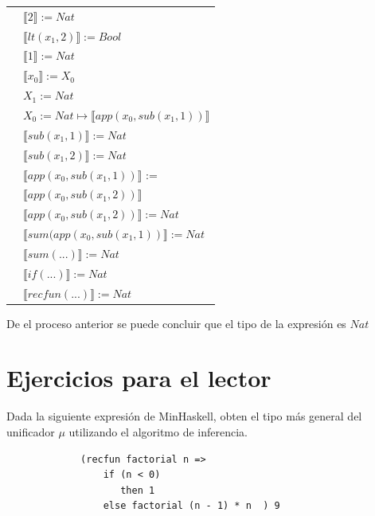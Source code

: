\begin{exercise}
\begin{description}
\begin{center}
\begin{longtable}{ | l | l | }
                        & $ \llbracket 2 \rrbracket := Nat$\\ 
                        & $ \llbracket lt(x_1 , 2) \rrbracket := Bool$\\  
			     & $ \llbracket 1 \rrbracket := Nat$\\
			     & $ \llbracket x_0 \rrbracket := X_0$\\
			     & $X_1 := Nat$\\
			     & $X_0 := Nat \mapsto  \llbracket app(x_0, sub(x_1,1)) \rrbracket$\\
			     & $ \llbracket sub(x_1,1) \rrbracket := Nat$\\
			     & $ \llbracket sub(x_1,2) \rrbracket := Nat$ \\
			     & $ \llbracket app(x_0, sub(x_1,1)) \rrbracket$ := \\
			     & $ \llbracket app(x_0, sub(x_1,2)) \rrbracket$\\ 
			     & $ \llbracket app(x_0, sub(x_1,2)) \rrbracket := Nat$ \\
			     & $ \llbracket sum(app(x_0, sub(x_1,1)) \rrbracket := Nat$ \\
			     & $ \llbracket sum(...) \rrbracket := Nat$ \\
			     & $ \llbracket if(...) \rrbracket := Nat$  \\
                        & $ \llbracket recfun(...) \rrbracket := Nat$ \\ 
                    \hline
                \end{longtable}
            \end{center}
            De el proceso anterior se puede concluir que el tipo de la expresión es $Nat$
        \end{description}
    \end{exercise}

    
    \section{Ejercicios para el lector}

     \begin{exercise} Dada la siguiente expresión de MinHaskell, obten el tipo más general del unificador $\mu$ utilizando el algoritmo de inferencia.
          \begin{lstlisting}
             (recfun factorial n => 
                 if (n < 0) 
                    then 1
                 else factorial (n - 1) * n  ) 9
           \end{lstlisting}
     \end{exercise}


